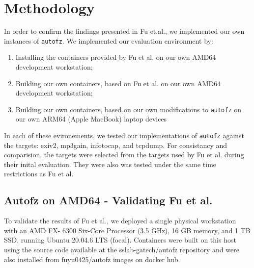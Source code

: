 \section{Methodology}

\newcommand{\pdiff}{diff_{peak}}

In order to confirm the findings presented in Fu et.al.\cite{fu_autofz_2023}, we implemented our 
own instances of \texttt{autofz}. We implemented our evaluation environment by:

\begin{enumerate}
    \item Installing the containers provided by Fu et al. \cite{fu_autofz_2023} on our own
    AMD64 development workstation;
    \item Building our own containers, based on Fu et al. \cite{fu_autofz_2023} on our own
    AMD64 development workstation;
    \item Building our own containers, based on our own modifications to \texttt{autofz} on our own 
    ARM64 (Apple MacBook) laptop devices
\end{enumerate}

In each of these evironements, we tested our implementations of \texttt{autofz} against the 
targets: exiv2, mp3gain, infotocap, and tcpdump. For consistancy and comparision, 
the targets were selected from the targets used by Fu et al. during their inital evaluation.
They were also was tested under the same time restrictions as Fu et al.

\subsection{Autofz on AMD64 - Validating Fu et al.\cite{fu_autofz_2023}}

To validate the results of Fu et al., we deployed a single physical workstation with 
an AMD FX\texttrademark - 6300 Six-Core Processor (3.5 GHz), 16 GB memory, and 1 TB 
SSD, running Ubuntu 20.04.6 LTS (focal). Containers were built on this host using 
the source code available at the sslab-gatech/autofz repository \cite{noauthor_sslab-gatechautofz_2024} 
and were also installed from fuyu0425/autofz images on docker hub\cite{noauthor_fuyu0425autofz_nodate}.

